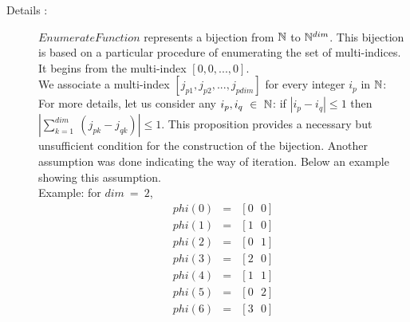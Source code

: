 \begin{description}
\begin{description}
         \end{description}
         \item[Details :] $EnumerateFunction$ represents a bijection from ${\mathbb N}$ to ${\mathbb N}^{dim}$. This bijection is based on a particular procedure of enumerating the set of multi-indices. It begins from the multi-index $[0,0,...,0]$. \\We associate a multi-index $[j_{p1}, j_{p2},..., j_{pdim}]$ for every integer $i_p$ in ${\mathbb N}$: \\ For more details, let us consider any $i_p, i_q~\in~{\mathbb N}$: if $|i_p-i_q|\leq 1$ then $|\sum_{k=1}^{dim}~(j_{pk}- j_{qk})| \leq 1$. This proposition provides a necessary but unsufficient condition for the construction of the bijection. Another assumption was done indicating the way of iteration. Below an example showing this assumption.\\
            Example:
            for $dim~=~2$,  
            \begin{eqnarray*}
               phi(0) &=& [0~~~0] \\
               phi(1) &=& [1~~~0] \\
               phi(2) &=& [0~~~1] \\
               phi(3) &=& [2~~~0] \\            
               phi(4) &=& [1~~~1] \\
               phi(5) &=& [0~~~2] \\
               phi(6) &=& [3~~~0] \\  
            \end{eqnarray*}
\end{description}

